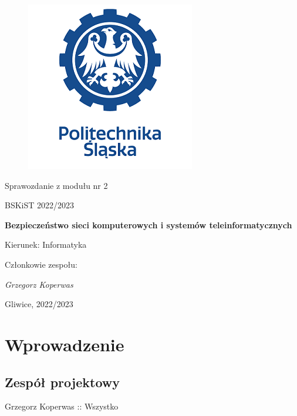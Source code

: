 \documentclass[12pt,a4paper]{article}
\begin{document}
\nocite{*}

\clearpage
\begin{figure}[h]
\centering
\includegraphics{media/ps-logo.png}
\end{figure}
\hspace{3cm}
\begin{center}Sprawozdanie z modułu nr 2\end{center}
\begin{center}BSKiST 2022/2023\end{center}
\hspace{3cm}
\begin{center}\large\textbf{Bezpieczeństwo sieci komputerowych i systemów teleinformatycznych}\end{center}
\hspace{7cm}
\begin{flushright}Kierunek: Informatyka
\end{flushright}
\begin{flushright}Członkowie zespołu:
\par
\textit{Grzegorz Koperwas}
\end{flushright}
\vfill
\begin{center}Gliwice, 2022/2023\end{center}

\newpage
{}
\tableofcontents

\newpage
\section{Wprowadzenie}

\subsection{Zespół projektowy}
Grzegorz Koperwas :: Wszystko
\end{document}
